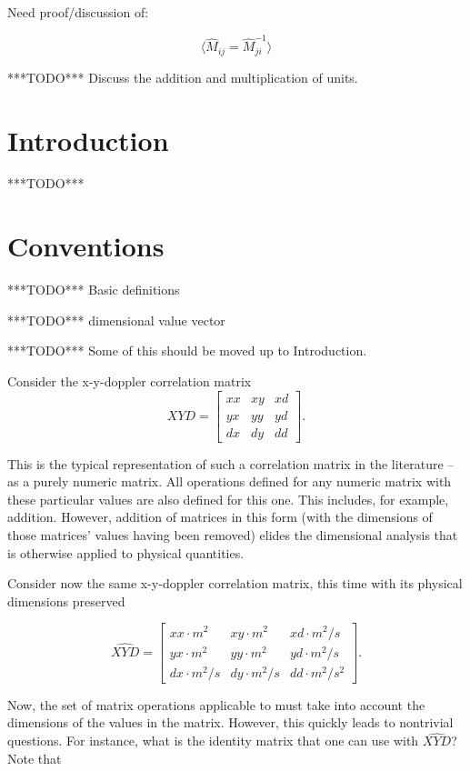 \documentclass[10pt,letterpaper]{article}
\author{T. Zachary Laine}
\numberwithin{equation}{section}
\begin{document}
Need proof/discussion of:

\[ \langle \hat{M}_{ij} = \hat{M}^{-1}_{ji}\rangle \]

***TODO*** Discuss the addition and multiplication of units.

\section{Introduction}

***TODO***

\section{Conventions}

***TODO*** Basic definitions

***TODO*** dimensional value vector

***TODO*** Some of this should be moved up to Introduction.

Consider the x-y-doppler correlation matrix
\[XYD = \left[ \begin{matrix}
xx & xy & xd \\ yx & yy & yd \\ dx & dy & dd
\end{matrix} \right]. \]

This is the typical representation of such a correlation matrix in the
literature – as a purely numeric matrix.  All operations defined for
any numeric matrix with these particular values are also defined for
this one.  This includes, for example, addition.  However, addition of
matrices in this form (with the dimensions of those matrices' values
having been removed) elides the dimensional analysis that is otherwise
applied to physical quantities.

Consider now the same x-y-doppler correlation matrix, this time with
its physical dimensions preserved

\[ \widehat{XYD}= \left[ \begin{matrix}
  xx \cdot m^2 & xy \cdot m^2 & xd \cdot m^2/s \\
  yx \cdot m^2 & yy \cdot m^2 & yd \cdot m^2/s \\
  dx \cdot m^2/s & dy \cdot m^2/s & dd \cdot m^2/s^2
\end{matrix} \right]. \]

Now, the set of matrix operations applicable to must take into account
the dimensions of the values in the matrix.  However, this quickly
leads to nontrivial questions.  For instance, what is the identity
matrix that one can use with $\widehat{XYD}$?  Note that
\end{document}
